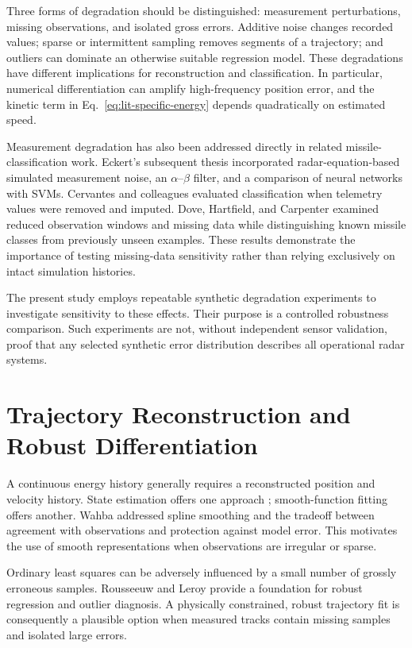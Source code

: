 Three forms of degradation should be distinguished: measurement
perturbations, missing observations, and isolated gross errors.
Additive noise changes recorded values; sparse or intermittent
sampling removes segments of a trajectory; and outliers can
dominate an otherwise suitable regression model. These
degradations have different implications for reconstruction
and classification. In particular, numerical differentiation
can amplify high-frequency position error, and the kinetic
term in Eq.~\eqref{eq:lit-specific-energy} depends quadratically
on estimated speed.

Measurement degradation has also been addressed directly in
related missile-classification work. Eckert's subsequent thesis
\cite{eckert2020thesis} incorporated radar-equation-based
simulated measurement noise, an $\alpha$--$\beta$ filter,
and a comparison of neural networks with SVMs.
Cervantes and colleagues \cite{cervantes2024telemetry}
evaluated classification when telemetry values were removed
and imputed. Dove, Hartfield, and Carpenter
\cite{dove2025novelty} examined reduced observation windows
and missing data while distinguishing known missile classes
from previously unseen examples. These results demonstrate
the importance of testing missing-data sensitivity rather than
relying exclusively on intact simulation histories.

The present study employs repeatable synthetic degradation
experiments to investigate sensitivity to these effects.
Their purpose is a controlled robustness comparison. Such
experiments are not, without independent sensor validation,
proof that any selected synthetic error distribution describes
all operational radar systems.

\section{Trajectory Reconstruction and Robust Differentiation}
\label{sec:lit-reconstruction}

A continuous energy history generally requires a reconstructed
position and velocity history. State estimation offers one
approach \cite{kalman1960filtering,barshalom2001estimation};
smooth-function fitting offers another. Wahba
\cite{wahba1978smoothing} addressed spline smoothing
and the tradeoff between agreement with observations and
protection against model error. This motivates the use of
smooth representations when observations are irregular or sparse.

Ordinary least squares can be adversely influenced by a small
number of grossly erroneous samples. Rousseeuw and Leroy
\cite{rousseeuw1987robust} provide a foundation for robust
regression and outlier diagnosis. A physically constrained,
robust trajectory fit is consequently a plausible option
when measured tracks contain missing samples and isolated
large errors.

